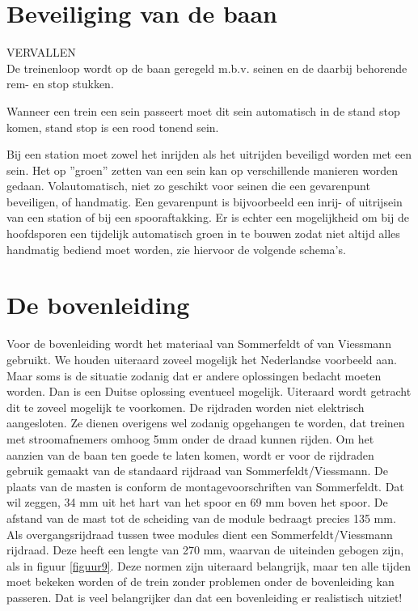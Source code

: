 \documentclass[12pt,a4paper]{report}
\begin{document}
\chapter{Beveiliging van de baan}
VERVALLEN
\\
De treinenloop wordt op de baan geregeld m.b.v. seinen en de daarbij behorende rem- en stop stukken.

Wanneer een trein een sein passeert moet dit sein automatisch in de stand stop komen,
stand stop is een rood tonend sein.

Bij een station moet zowel het inrijden als het uitrijden beveiligd worden met een sein. Het op ''groen'' zetten van een sein kan op verschillende manieren worden gedaan. Volautomatisch, niet zo geschikt voor seinen die een gevarenpunt beveiligen, of handmatig.
Een gevarenpunt is bijvoorbeeld een inrij- of uitrijsein van een station of bij een spooraftakking. Er is echter een mogelijkheid om bij de hoofdsporen een tijdelijk automatisch groen in te bouwen zodat niet altijd alles handmatig bediend moet worden, zie hiervoor de volgende schema's.

\chapter{De bovenleiding}

Voor de bovenleiding wordt het materiaal van Sommerfeldt of van Viessmann gebruikt. We houden uiteraard zoveel mogelijk het Nederlandse voorbeeld aan. Maar soms is de situatie zodanig dat er andere oplossingen bedacht moeten worden. Dan is een Duitse oplossing eventueel mogelijk. Uiteraard wordt getracht dit te zoveel mogelijk te voorkomen. De rijdraden worden niet elektrisch aangesloten. Ze dienen overigens wel zodanig opgehangen te worden, dat treinen met stroomafnemers omhoog 5mm onder de draad kunnen rijden. Om het aanzien van de baan ten goede te laten komen, wordt er voor de rijdraden gebruik gemaakt van de standaard rijdraad van Sommerfeldt/Viessmann. De plaats van de masten is conform de montagevoorschriften van Sommerfeldt. Dat wil zeggen, 34 mm uit het hart van het spoor en 69 mm boven het spoor. De afstand van de mast tot de scheiding van de module bedraagt precies 135 mm. Als overgangsrijdraad tussen twee modules dient een Sommerfeldt/Viessmann rijdraad. Deze heeft een lengte van 270 mm, waarvan de uiteinden gebogen zijn, als in figuur \ref{figuur9}. Deze normen zijn uiteraard belangrijk, maar ten alle tijden moet bekeken worden of de trein zonder problemen onder de bovenleiding kan passeren. Dat is veel belangrijker dan dat een bovenleiding er realistisch uitziet!
\end{document}
